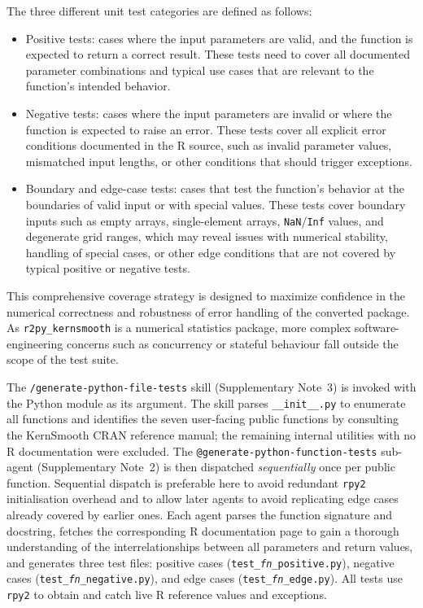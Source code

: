 \documentclass[12pt,a4paper]{article}
\makeatletter
\newcommand{\skill}[1]{\texttt{/#1}}
\newcommand{\agent}[1]{\texttt{@#1}}
\newcommand{\pkg}[1]{\texttt{#1}}
\newcommand{\suppnote}[1]{Supplementary Note~#1}
\makeatother
\begin{document}
The three different unit test categories are defined as follows:
\begin{itemize}
    \item Positive tests: cases where the input parameters are valid, and the function is expected to return a correct result. These tests need to cover all documented parameter combinations and typical use cases that are relevant to the function's intended behavior.
    \item Negative tests: cases where the input parameters are invalid or where the function is expected to raise an error. These tests cover all explicit error conditions documented in the R source, such as invalid parameter values, mismatched input lengths, or other conditions that should trigger exceptions.
    \item Boundary and edge-case tests: cases that test the function's behavior at the boundaries of valid input or with special values. These tests cover boundary inputs such as empty arrays, single-element arrays, \texttt{NaN}/\texttt{Inf} values, and degenerate grid ranges, which may reveal issues with numerical stability, handling of special cases, or other edge conditions that are not covered by typical positive or negative tests.
\end{itemize}
This comprehensive coverage strategy is designed to maximize confidence in the numerical correctness and robustness of error handling of the converted package. As \pkg{r2py\_kernsmooth} is a numerical statistics package, more complex software-engineering concerns such as concurrency or stateful behaviour fall outside the scope of the test suite.

The \skill{generate-python-file-tests} skill (\suppnote{3}) is invoked with the Python module as its argument. The skill parses \texttt{\_\_init\_\_.py} to enumerate all functions and identifies the seven user-facing public functions by consulting the KernSmooth CRAN reference manual; the remaining internal utilities with no R documentation were excluded. The \agent{generate-python-function-tests} sub-agent (\suppnote{2}) is then dispatched \textit{sequentially} once per public function. Sequential dispatch is preferable here to avoid redundant \pkg{rpy2} initialisation overhead and to allow later agents to avoid replicating edge cases already covered by earlier ones. Each agent parses the function signature and docstring, fetches the corresponding R documentation page to gain a thorough understanding of the interrelationships between all parameters and return values, and generates three test files: positive cases (\texttt{test\_\textit{fn}\_positive.py}), negative cases (\texttt{test\_\textit{fn}\_negative.py}), and edge cases (\texttt{test\_\textit{fn}\_edge.py}). All tests use \pkg{rpy2} to obtain and catch live R reference values and exceptions.
\end{document}
